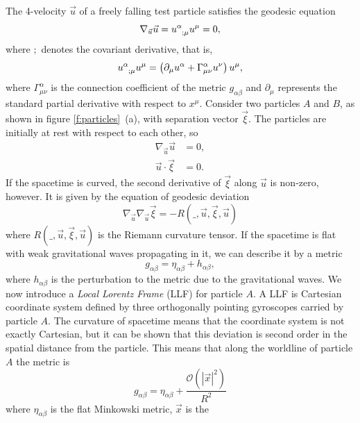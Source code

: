 The 4-velocity $\vec{u}$ of a freely falling test particle satisfies the
geodesic equation
\begin{equation}
\label{eq:geodessic}
\nabla_{\vec{u}} \vec{u} = \tensor{u}{^\alpha_{;\mu}}u^{\mu} = 0,
\end{equation}
where $;$ denotes the covariant derivative, that is,
\begin{equation}
\tensor{u}{^\alpha_{;\mu}}\tensor{u}{^{\mu}} = \left(\partial_\mu\tensor{u}{^\alpha} +
\Gamma^\alpha_{\mu\nu}u^\nu\right) u^\mu,
\end{equation}
where $\Gamma^\alpha_{\mu\nu}$ is the connection coefficient of the metric
$g_{\alpha\beta}$ and $\partial_\mu$ represents the standard partial
derivative with respect to $x^\mu$. Consider two particles $A$ and $B$, as
shown in figure \ref{f:particles}~(a), with separation vector $\vec{\xi}$. The
particles are initially at rest with respect to each other, so
\begin{align}
\nabla_{\vec{u}} \vec{u} &= 0, \\
\vec{u} \cdot \vec{\xi} & = 0.
\end{align}
If the spacetime is curved, the second derivative of $\vec{\xi}$ along
$\vec{u}$ is non-zero, however. It is given by the equation of geodesic
deviation
\begin{equation}
\nabla_{\vec{u}}\nabla_{\vec{u}} \vec{\xi} = - R(\_,\vec{u},\vec{\xi},\vec{u})
\end{equation}
where $R(\_,\vec{u},\vec{\xi},\vec{u})$ is the Riemann curvature tensor. 
If the spacetime is flat with weak gravitational waves propagating in it, we
can describe it by a metric 
\begin{equation}
g_{\alpha\beta} = \eta_{\alpha\beta} + h_{\alpha\beta},
\end{equation}
where $h_{\alpha\beta}$ is the perturbation to the metric due to 
the gravitational waves.  We now introduce a \emph{Local Lorentz Frame} (LLF)
for particle $A$. A LLF is Cartesian coordinate system defined by three
orthogonally pointing gyroscopes carried by particle $A$. The curvature of
spacetime means that the coordinate system is not exactly Cartesian, but it
can be shown that this deviation is second order in the spatial distance from
the particle\cite{MTW73}. This means that along the worldline of particle $A$
the metric is
\begin{equation}
g_{\alpha\beta} = \eta_{\alpha\beta} + \frac{\mathcal{O}\left(|\vec{x}|^2\right)}{R^2}
\end{equation}
where $\eta_{\alpha\beta}$ is the flat Minkowski metric, $\vec{x}$ is the
